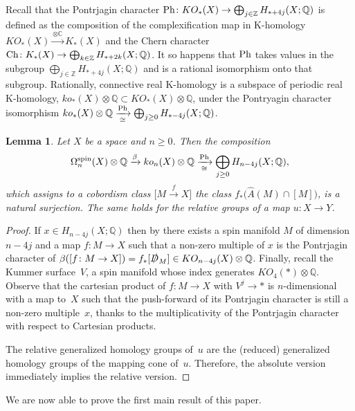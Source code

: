 \documentclass[10pt,a4paper]{amsart}
\numberwithin{equation}{section}
\newtheorem{Lemma}[Theorem]{Lemma}
\def\CC{\ensuremath{\mathbb{C}}}
\def\QQ{\ensuremath{\mathbb{Q}}}
\def\ZZ{\ensuremath{\mathbb{Z}}}
\newcommand{\rationals}{\mathbb{Q}}
\newcommand{\tensor}{\otimes}
\newcommand{\iso}{\cong}
\DeclareMathOperator{\spin}{spin}
\begin{document}
Recall that the Pontrjagin character
$
{\rm Ph}\colon KO_*(X)\to \bigoplus_{j\in \ZZ}H_{*+4j}(X;\QQ)
$
is defined as the composition of the complexification map in K-homology
$KO_*(X)\xrightarrow{\otimes\CC}K_*(X)$ and the Chern character ${\rm Ch}\colon
K_*(X)\to \bigoplus_{k\in \ZZ}H_{*+2k}(X;\QQ)$. It so happens that ${\rm Ph}$
takes values in the subgroup $\bigoplus_{j\in\ZZ} H_{*+4j}(X;\QQ)$
and is a rational isomorphism onto that subgroup. Rationally, connective
real K-homology is a subspace of periodic real K-homology,
$ko_*(X)\tensor\rationals\subset KO_*(X)\tensor\rationals$, under the
Pontryagin character isomorphism
$ko_*(X)\tensor\rationals\xrightarrow[\iso]{{\rm Ph}}
\bigoplus_{j\ge 0} H_{*-4j}(X;\rationals)$.

\begin{Lemma}\label{pontrjagin-surjective}
 Let $X$ be a space and $n\geq0$. Then
 the composition
 \begin{equation*}%
 \Omega^{\spin}_{n}(X)\otimes\QQ \xrightarrow{\beta}
 ko_{n}(X)\otimes\QQ \xrightarrow[\cong]{{\rm Ph}} \bigoplus_{j\geq0}H_{n-4j}(X;\QQ),\end{equation*}
 which assigns to a cobordism class $\big[M\xrightarrow{f}X\big]$ the class $f_*\big(\hat{A}(M)\cap [M]\big)$,
 is a natural surjection. The same holds for the relative groups
 of a map $u\colon X\to Y$.
\end{Lemma}
\begin{proof}
 If $x\in H_{n-4j}(X;\QQ)$ then by \cite[Proposition~3.1]{XieYuZeidler} there
 exists a spin manifold $M$ of dimension $n-4j$ and a map $f\colon M\to X$
 such that a non-zero multiple of $x$ is the Pontrjagin character of
 $\beta([f\colon M\to X]) =f_*[\slashed{D}_M]\in
 KO_{n-4j}(X)\otimes\QQ$. Finally, recall the Kummer surface~$V$, a spin manifold whose index generates $KO_4(*)\otimes \QQ$.
 Observe that the cartesian product of $f\colon M\to
 X$ with $V^j\to *$ is $n$-dimensional with a map to~$X$ such
 that the push-forward of its Pontrjagin character is still a non-zero
 multiple~$x$, thanks to
 the multiplicativity of the Pontrjagin character with respect to Cartesian products.

 The relative generalized homology groups of~$u$ are the (reduced) generalized
 homology groups of the mapping cone of~$u$. Therefore, the
 absolute version immediately implies the relative version.
\end{proof}

We are now able to prove the first main result of this paper.
\end{document}

